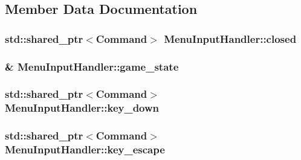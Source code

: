 \subsection{Member Data Documentation}
\hypertarget{class_menu_input_handler_a493334cca9bde4229be296ad44e3db9b}{}
\subsubsection[{closed}]{\setlength{\rightskip}{0pt plus 5cm}std\+::shared\+\_\+ptr$<${\bf Command}$>$ Menu\+Input\+Handler\+::closed\hspace{0.3cm}{\ttfamily [private]}}\label{class_menu_input_handler_a493334cca9bde4229be296ad44e3db9b}
\hypertarget{class_menu_input_handler_a6574e69d6344c10cb1dd53c6e2ffac26}{}
\subsubsection[{game\+\_\+state}]{\& Menu\+Input\+Handler\+::game\+\_\+state\hspace{0.3cm}{\ttfamily [private]}}\label{class_menu_input_handler_a6574e69d6344c10cb1dd53c6e2ffac26}
\hypertarget{class_menu_input_handler_a29143574ca3b79dccb3a98260184968c}{}
\subsubsection[{key\+\_\+down}]{\setlength{\rightskip}{0pt plus 5cm}std\+::shared\+\_\+ptr$<${\bf Command}$>$ Menu\+Input\+Handler\+::key\+\_\+down\hspace{0.3cm}{\ttfamily [private]}}\label{class_menu_input_handler_a29143574ca3b79dccb3a98260184968c}
\hypertarget{class_menu_input_handler_abf019bb1ca2f82975870e932e3cbd558}{}
\subsubsection[{key\+\_\+escape}]{\setlength{\rightskip}{0pt plus 5cm}std\+::shared\+\_\+ptr$<${\bf Command}$>$ Menu\+Input\+Handler\+::key\+\_\+escape\hspace{0.3cm}{\ttfamily [private]}}\label{class_menu_input_handler_abf019bb1ca2f82975870e932e3cbd558}
\hypertarget{class_menu_input_handler_aa16ab7856da1bc4c6dea371e244939fb}{}
